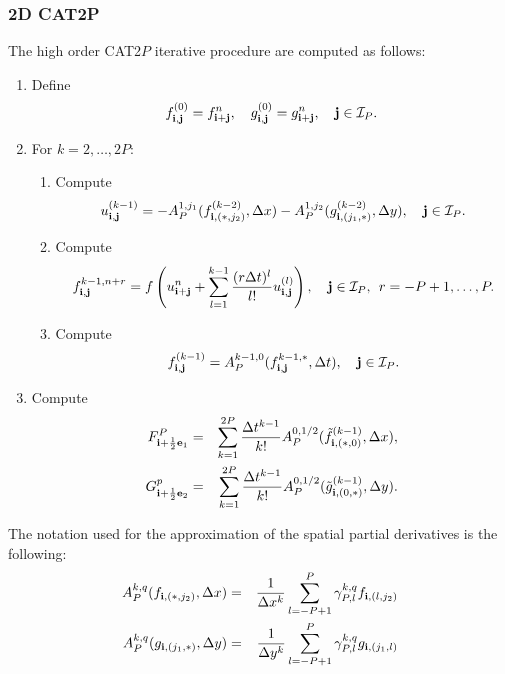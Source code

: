 \subsubsection{2D CAT2P}
The high order CAT2$P$ iterative procedure are computed as follows:

\begin{enumerate}

\item  {Define}
$$
f^{(0)}_{\mathbf{i},\mathbf{j}}=f^n_{\mathbf{i} + \mathbf{j}}, \quad  g^{(0)}_{\mathbf{i},\mathbf{j}}=g^n_{\mathbf{i} + \mathbf{j}}, \quad \mathbf{j} \in \mathcal{I}_P.
$$

\item  {For $k = 2, \dots, 2P$:}

\begin{enumerate}
\item Compute
\begin{equation*}
 u^{(k-1)}_{\mathbf{i},\mathbf{j}} = - A^{1,j_1}_{P}(f^{(k-2)}_{\mathbf{i},({*}, j_2)}, \Delta x) 
 - A^{1,j_2}_{P}(g^{(k-2)}_{\mathbf{i},(j_1, {*})}, \Delta y), \quad \mathbf{j} \in \mathcal{I}_P.
\end{equation*}
\item Compute 
$$
f^{k-1,n+r}_{\mathbf{i},\mathbf{j}} = f \left(  u^n_{\mathbf{i} + \mathbf{j}} + 
\sum_{l=1}^{k-1} \frac{(r \Delta t)^l}{l!} u^{(l)}_{\mathbf{i},\mathbf{j}} \right), \quad  \mathbf{j}\in \mathcal{I}_P,\;\, r = -P+1, \dots, P.
$$
\item Compute
$$
f^{(k-1)}_{\mathbf{i},\mathbf{j}} =   A^{k-1,0}_{P}( f^{k-1, {*}}_{\mathbf{i},\mathbf{j}}, \Delta t),\quad  \mathbf{j} \in \mathcal{I}_P.
$$
\end{enumerate}

\item Compute
\begin{eqnarray}\label{cat22Dx}
F^P_{\mathbf{i}+\frac{1}{2}\mathbf{e}_1}  &= &\sum_{k=1}^{2P} 
\frac{\Delta t^{k-1}}{k!}A^{0, 1/2}_{P}(\tilde{f}_{\mathbf{i},({*}, 0)}^{(k-1)}, \Delta x), 
\\\label{cat22Dy}
G^p_{\mathbf{i}+\frac{1}{2}\mathbf{e}_2}  &= &\sum_{k=1}^{2P} 
\frac{\Delta t^{k-1}}{k!}A^{0, 1/2}_{P}(\tilde{g}_{\mathbf{i}, (0, {*})}^{(k-1)}, \Delta y).
\end{eqnarray}

\end{enumerate}
The notation used for the approximation of the spatial partial derivatives is the following:
\begin{eqnarray*}
 A^{k,q}_{P}(f_{\mathbf{i}, ({*}, j_2)}, \Delta x) & =&  \frac{1}{\Delta x^k} \sum_{l = -P + 1}^P \gamma^{k,q}_{P,l} f_{\mathbf{i}, (l,j_2)}\\
 A^{k,q}_{P}(g_{\mathbf{i}, (j_1,{*}{} )}, \Delta y) & =&  \frac{1}{\Delta y^k} \sum_{l = -P + 1}^P \gamma^{k,q}_{P,l} g_{\mathbf{i}, (j_1,l)}
 \end{eqnarray*}
 
